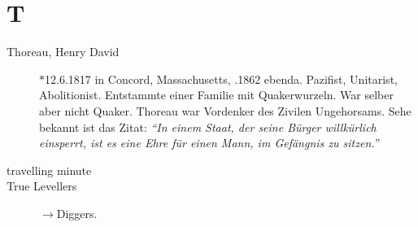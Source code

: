 \section*{T}

\articlesize

\begin{description}

 \item[Thoreau, Henry David] $\ast$12.6.1817 in Concord, Massachusetts, .1862 ebenda. Pazifist, Unitarist, Abolitionist. Entstammte einer Familie mit Quakerwurzeln. War selber aber nicht Quaker. Thoreau war Vordenker des Zivilen Ungehorsams. Sehe bekannt ist das Zitat: \textit{"`In einem Staat, der seine Bürger willkürlich einsperrt, ist es eine Ehre für einen Mann, im Gefängnis zu sitzen."'}

 \item[travelling minute]

 \item[True Levellers] $\to$Diggers.

 \end{description}

\normalsize
